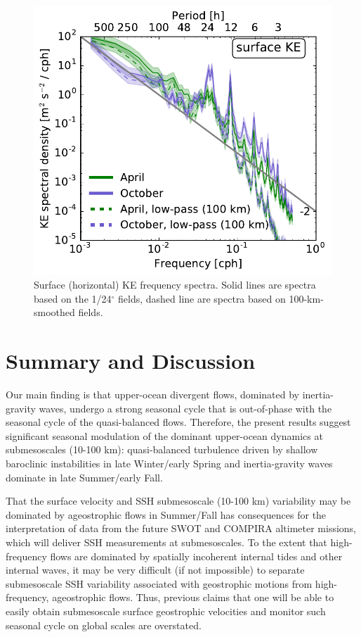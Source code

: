 \documentclass[grl]{agutex2015}
\begin{document}
\begin{article}
\begin{figure}[ht]
  \begin{center}
    \includegraphics[width=.45\textwidth]{figs/fig4.pdf}
 \caption{Surface (horizontal) KE frequency spectra. Solid lines
 are spectra based on the 1/24$^\circ$ fields, dashed line are spectra
 based on 100-km-smoothed fields.}
 \label{fig4}
 \end{center}
\end{figure}



\section{Summary and Discussion}
Our main finding is that
upper-ocean divergent flows, dominated by inertia-gravity waves, undergo
a strong seasonal cycle that is out-of-phase with the seasonal cycle of
the quasi-balanced flows. Therefore, the present results suggest significant
seasonal modulation of the dominant upper-ocean dynamics at submesoscales
(10-100 km): quasi-balanced turbulence driven by shallow baroclinic instabilities
in late Winter/early Spring
and inertia-gravity waves dominate in late Summer/early Fall.

That the surface velocity and SSH submesoscale (10-100 km) variability may be
dominated by ageostrophic flows in
Summer/Fall has consequences for the interpretation of data from
the future SWOT and COMPIRA altimeter missions,
which will deliver SSH measurements at submesoscales. To the extent that
high-frequency flows are dominated by spatially incoherent internal tides and other
internal waves, it may be very difficult (if not impossible) to
separate submesoscale SSH variability associated with geostrophic motions
from high-frequency, ageostrophic flows. Thus, previous claims that
one will be able to easily obtain submesoscale surface
geostrophic velocities and monitor such seasonal cycle on global scales
\citep{sasaki_etal2014,qiu_etal2014} are overstated.


\end{article}
\end{document}
